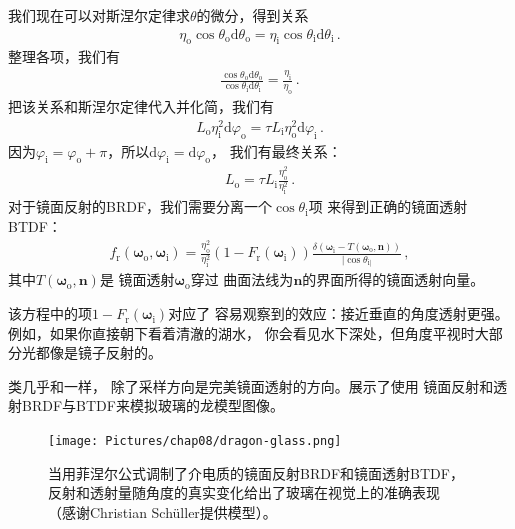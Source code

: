 我们现在可以对斯涅尔定律求$\theta$的微分，得到关系
\begin{align*}
    \eta_{\mathrm{o}}\cos\theta_{\mathrm{o}}\mathrm{d}\theta_{\mathrm{o}}=\eta_{\mathrm{i}}\cos\theta_{\mathrm{i}}\mathrm{d}\theta_{\mathrm{i}}\, .
\end{align*}
整理各项，我们有
\begin{align*}
    \frac{\cos\theta_{\mathrm{o}}\mathrm{d}\theta_{\mathrm{o}}}{\cos\theta_{\mathrm{i}}\mathrm{d}\theta_{\mathrm{i}}}=\frac{\eta_{\mathrm{i}}}{\eta_{\mathrm{o}}}\, .
\end{align*}
把该关系和斯涅尔定律代入并化简，我们有
\begin{align*}
    L_{\mathrm{o}}\eta_{\mathrm{i}}^2\mathrm{d}\varphi_{\mathrm{o}}=\tau L_{\mathrm{i}}\eta_{\mathrm{o}}^2\mathrm{d}\varphi_{\mathrm{i}}\, .
\end{align*}
因为$\varphi_{\mathrm{i}}=\varphi_{\mathrm{o}}+\pi$，所以$\mathrm{d}\varphi_{\mathrm{i}}=\mathrm{d}\varphi_{\mathrm{o}}$，
我们有最终关系：
\begin{align}
    \label{eq:8.7}
    L_{\mathrm{o}}=\tau L_{\mathrm{i}}\frac{\eta_{\mathrm{o}}^2}{\eta_{\mathrm{i}}^2}\, .
\end{align}
对于镜面反射的BRDF，我们需要分离一个$\cos\theta_{\mathrm{i}}$项
来得到正确的镜面透射BTDF：
\begin{align*}
    f_{\mathrm{r}}({\bm\omega}_{\mathrm{o}},{\bm\omega}_{\mathrm{i}})=\frac{\eta_{\mathrm{o}}^2}{\eta_{\mathrm{i}}^2}(1-F_{\mathrm{r}}({\bm\omega}_{\mathrm{i}}))\frac{\delta({\bm\omega}_{\mathrm{i}}-T({\bm\omega}_{\mathrm{o}},{\bm n}))}{|\cos\theta_{\mathrm{i}|}}\, ,
\end{align*}
其中$T({\bm\omega}_{\mathrm{o}},{\bm n})$是
镜面透射${\bm\omega}_{\mathrm{o}}$穿过
曲面法线为$\bm n$的界面所得的镜面透射向量。

该方程中的项$1-F_{\mathrm{r}}({\bm\omega}_{\mathrm{i}})$对应了
容易观察到的效应：接近垂直的角度透射更强。例如，如果你直接朝下看着清澈的湖水，
你会看见水下深处，但角度平视时大部分光都像是镜子反射的。

类几乎和一样，
除了采样方向是完美镜面透射的方向。展示了使用
镜面反射和透射BRDF与BTDF来模拟玻璃的龙模型图像。
\begin{figure}[htbp]
    \centering
    \texttt{[image: Pictures/chap08/dragon-glass.png]}
    \caption{当用菲涅尔公式调制了介电质的镜面反射BRDF和镜面透射BTDF，
        反射和透射量随角度的真实变化给出了玻璃在视觉上的准确表现
        （感谢Christian Schüller提供模型）。}
    \label{fig:8.10}
\end{figure}

